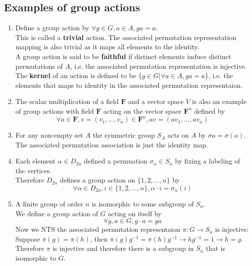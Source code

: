 \documentclass{article}
\begin{document}
\subsection*{Examples of group actions}
\begin{enumerate}
    \item Define a group action by $\forall g\in G, a\in A, ga = a$.\\
    This is called a \textbf{trivial} action. The associated permutation representation mapping is also trivial as it maps all elements to the identity.\\
    A group action is said to be \textbf{faithful} if distinct elements induce distinct permutations of $A$, i.e. the associated permutation representation is injective.\\
    The \textbf{kernel} of an action is defined to be $\{g\in G | \forall a \in A, ga = a\}$, i.e. the elements that maps to identity in the associated permutation representaion.
    \item The scalar multiplication of a field $\mathbf{F}$ and a vector space $V$ is also an example of group actions with field $\mathbf{F}$ acting on the vector space $\mathbf{F}^n$ defined by
    \begin{equation*}
        \forall a\in \mathbf{F}, v = (v_1, ..., v_n) \in \mathbf{F}^n, av = (av_1, ..., av_n)
    \end{equation*}
    \item For any non-empty set $A$ the symmetric group $S_A$ acts on $A$ by $\sigma a = \sigma(a)$. The associated permutation association is just the identity map.
    \item Each element $\alpha \in D_{2n}$ defined a permuation $\sigma_{\alpha} \in S_n$ by fixing a labeling of the vertices.\\
    Therefore $D_{2n}$ defines a group action on $\{1, 2, ..., n\}$ by
    \begin{equation*}
        \forall \alpha \in D_{2n}, i \in \{1, 2, ..., n\}, \alpha \cdot i = \sigma_\alpha(i)
    \end{equation*}
    \item A finite group of order $n$ is isomorphic to some subgroup of $S_n$.\\
    We define a group action of $G$ acting on itself by
    \begin{equation*}
        \forall g, a \in G, g\cdot a = ga
    \end{equation*}
    Now we NTS the associated permutation representaion $\pi:G \rightarrow S_n$ is injective:\\
    Suppose $\pi(g) = \pi(h)$, then $\pi(g)g^{-1} = \pi(h)g^{-1} \rightarrow hg^{-1} = 1 \rightarrow h = g$.\\
    Therefore $\pi$ is injective and therefore there is a subgroup in $S_n$ that is isomorphic to $G$.
\end{enumerate}
\end{document}
